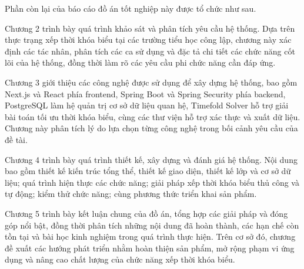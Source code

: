 \documentclass[../DoAn.tex]{subfiles}
\begin{document}
Phần còn lại của báo cáo đồ án tốt nghiệp này được tổ chức như sau.

Chương 2 trình bày quá trình khảo sát và phân tích yêu cầu hệ thống. Dựa trên thực trạng xếp thời khóa biểu tại các trường tiểu học công lập, chương này xác định các tác nhân, phân tích các ca sử dụng và đặc tả chi tiết các chức năng cốt lõi của hệ thống, đồng thời làm rõ các yêu cầu phi chức năng cần đáp ứng.

Chương 3 giới thiệu các công nghệ được sử dụng để xây dựng hệ thống, bao gồm Next.js và React phía frontend, Spring Boot và Spring Security phía backend, PostgreSQL làm hệ quản trị cơ sở dữ liệu quan hệ, Timefold Solver hỗ trợ giải bài toán tối ưu thời khóa biểu, cùng các thư viện hỗ trợ xác thực và xuất dữ liệu. Chương này phân tích lý do lựa chọn từng công nghệ trong bối cảnh yêu cầu của đề tài.

Chương 4 trình bày quá trình thiết kế, xây dựng và đánh giá hệ thống. Nội dung bao gồm thiết kế kiến trúc tổng thể, thiết kế giao diện, thiết kế lớp và cơ sở dữ liệu; quá trình hiện thực các chức năng; giải pháp xếp thời khóa biểu thủ công và tự động; kiểm thử chức năng; cùng phương thức triển khai sản phẩm.

Chương 5 trình bày kết luận chung của đồ án, tổng hợp các giải pháp và đóng góp nổi bật, đồng thời phân tích những nội dung đã hoàn thành, các hạn chế còn tồn tại và bài học kinh nghiệm trong quá trình thực hiện. Trên cơ sở đó, chương đề xuất các hướng phát triển nhằm hoàn thiện sản phẩm, mở rộng phạm vi ứng dụng và nâng cao chất lượng của chức năng xếp thời khóa biểu.
\end{document}
